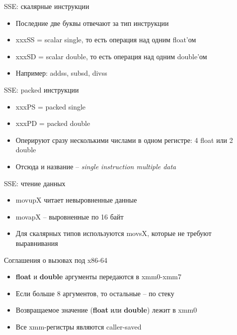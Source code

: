 \documentclass[10pt,pdf,hyperref={unicode}]{beamer}
\newcommand{\asm}[1]{\colorbox{shadecolor}{#1}}
\begin{document}
\begin{frame}{SSE: скалярные инструкции}
\begin{itemize}
    \item Последние две буквы отвечают за тип инструкции
    \item xxxSS = scalar single, то есть операция над одним float'ом
    \item xxxSD = scalar double, то есть операция над одним double'ом
    \item Например: \asm{addss}, \asm{subsd}, \asm{divss}
\end{itemize}
\end{frame}

\begin{frame}{SSE: packed инструкции}
\begin{itemize}
    \item xxxPS = packed single
    \item xxxPD = packed double
    \item Оперируют сразу несколькими числами в одном регистре: 4 float или 2 double
    \item Отсюда и название -- \emph{single instruction multiple data}
\end{itemize}
\end{frame}

\begin{frame}{SSE: чтение данных}
\begin{itemize}
    \item \asm{movupX} читает невыровненные данные
    \item \asm{movapX} -- выровненные по 16 байт
    \item Для скалярных типов используются \asm{movsX}, которые не требуют выравнивания
\end{itemize}
\end{frame}

\begin{frame}{Соглашения о вызовах под x86-64}
\begin{itemize}
    \item \textbf{float} и \textbf{double} аргументы передаются в \asm{xmm0}-\asm{xmm7}
    \item Если больше 8 аргументов, то остальные -- по стеку
    \item Возвращаемое значение (\textbf{float} или \textbf{double}) лежит в \asm{xmm0}
    \item Все xmm-регистры являются caller-saved
\end{itemize}
\end{frame}
\end{document}
